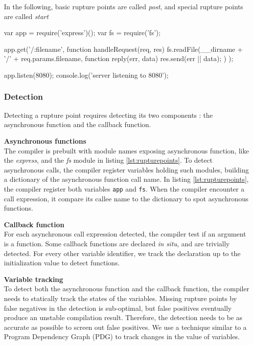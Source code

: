 In the following, basic rupture points are called \textit{post}, and special rupture points are called \textit{start}


\begin{code}[Javascript, caption={Example of an application presenting the two types of rupture points : a \texttt{start} with the call to \texttt{app.get()}, and a \texttt{post} with the call to \texttt{fs.readFile()}},label={lst:rupturepoints}]
var app = require('express')();
var fs = require('fs');

app.get('/:filename', function handleRequest(req, res) {
  fs.readFile(__dirname + '/' + req.params.filename, function reply(err, data) {
    res.send(err || data);
  })
});

app.listen(8080);
console.log('server listening to 8080');
\end{code}

\subsubsection{Detection}

Detecting a rupture point requires detecting its two components : the asynchronous function and the callback function.

\textbf{Asynchronous functions}\\
The compiler is prebuilt with module names exposing asynchronous function, like the \textit{express}, and the \textit{fs} module in listing \ref{lst:rupturepoints}.
To detect asynchronous calls, the compiler register variables holding such modules, building a dictionary of the asynchronous function call name.
In listing \ref{lst:rupturepoints}, the compiler register both variables \texttt{app} and \texttt{fs}.
When the compiler encounter a call expression, it compare its callee name to the dictionary to spot asynchronous functions.

\textbf{Callback function}\\
For each asynchronous call expression detected, the compiler test if an argument is a function.
Some callback functions are declared \textit{in situ}, and are trivially detected.
For every other variable identifier, we track the declaration up to the initialization value to detect functions.

\textbf{Variable tracking}\\
To detect both the asynchronous function and the callback function, the compiler needs to statically track the states of the variables.
Missing rupture points by false negatives in the detection is sub-optimal, but false positives eventually produce an unstable compilation result.
Therefore, the detection needs to be as accurate as possible to screen out false positives.
We use a technique similar to a Program Dependency Graph (PDG)\cite{Ferrante1987} to track changes in the value of variables.


